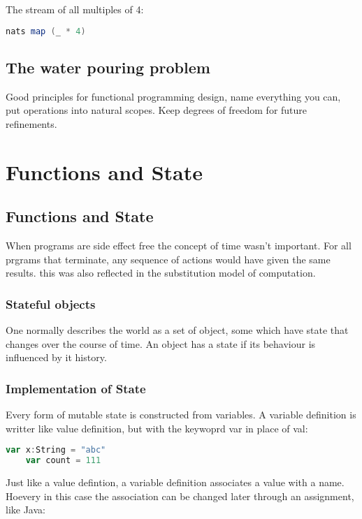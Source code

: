 \documentclass[10pt, a4paper]{report}
\begin{document}
The stream of all multiples of 4:

\begin{lstlisting}[language=scala]
	nats map (_ * 4)
\end{lstlisting}

\section{The water pouring problem}
Good principles for functional programming design, name everything you can, put operations into natural scopes. Keep degrees of freedom for future refinements.

\chapter{Functions and State}

\section{Functions and State}

When programs are side effect free the concept of time wasn't important. For all prgrams that terminate, any sequence of actions would have given the same results. this was also reflected in the substitution model of computation.\\

\subsection{Stateful objects} One normally describes the world as a set of object, some which have state that changes over the course of time. An object has a state if its behaviour is influenced by it history.\\

\subsection{Implementation of State}

Every form of mutable state is constructed from variables. A variable definition is writter like value definition, but with the keywoprd var in place of val:

\begin{lstlisting}[language=scala]
	var x:String = "abc"
	var count = 111
\end{lstlisting}

Just like a value defintion, a variable definition associates a value with a name. Hoevery in this case the association can be changed later through an assignment, like Java:\\
\end{document}
